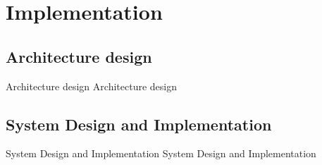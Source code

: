 \section{Implementation}

\subsection{Architecture design}

\begin{frame}{Architecture design}
  Architecture design
\end{frame}

\subsection{System Design and Implementation}

\begin{frame}{System Design and Implementation}
  System Design and Implementation
\end{frame}
